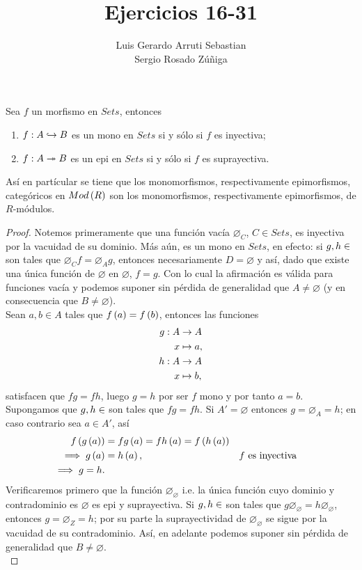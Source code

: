 \documentclass{article}
\title{Ejercicios 16-31}
\author{Luis Gerardo Arruti Sebastian\\ Sergio Rosado Zúñiga}
\date{}
\begin{document}
	\maketitle
	\begin{lem}
		Sea $f$ un morfismo en $Sets$, entonces
		\begin{enumerate}[label=$\alph*)$]
			\item $\catarrow{f}{A}{B}{m}$ es un mono en $Sets$ si y sólo si $f$ es inyectiva;
			\item $\catarrow{f}{A}{B}{e}$ es un epi en $Sets$ si y sólo si $f$ es suprayectiva.
		\end{enumerate}
		Así en partícular se tiene que los monomorfismos, respectivamente epimorfismos, categóricos en $Mod\left(R\right)$ son los monomorfismos, respectivamente epimorfismos, de $R$-módulos.
		\begin{proof}
			 Notemos primeramente que una función vacía $\varnothing_C$, $C\in Sets$, es inyectiva por la vacuidad de su dominio. Más aún, es un mono en $Sets$, en efecto: si $g,h\in\ringmod{Sets}{D}{\varnothing}$ son tales que $\varnothing_C f=\varnothing_A g$, entonces necesariamente $D=\varnothing$ y así, dado que existe una única función de $\varnothing$ en $\varnothing$, $f=g$. Con lo cual la afirmación es válida para funciones vacía y podemos suponer sin pérdida de generalidad que $A\neq\varnothing$ (y en consecuencia que $B\neq\varnothing$).\\
			 Sean $a,b\in A$ tales que $f\left(a\right)=f\left(b\right)$, entonces las funciones
			\begin{align*}
				g: A &\rightarrow A\\ x &\mapsto a,\\
				h: A &\rightarrow A\\ x &\mapsto b,
			\end{align*}
			satisfacen que $fg=fh$, luego $g=h$ por  ser $f$ mono y por tanto $a=b$.\\
			 Supongamos que  $g,h\in\ringmod{Sets}{A'}{A}$ son tales que $fg=fh$. Si $A'=\varnothing$ entonces $g=\varnothing_A=h$; en caso contrario sea $a\in A'$, así
			\begin{align*}
				f\left(g\left(a\right)\right)&=fg\left(a\right)=fh\left(a\right)=f\left(h\left(a\right)\right)\\
				\implies g\left(a\right)&=h\left(a\right), && f\text{ es inyectiva}\\
				\implies g=h.
			\end{align*}
			 Verificaremos primero que la función $\varnothing_\varnothing$ i.e. la única función cuyo dominio y contradominio es $\varnothing$ es epi y suprayectiva. Si  $g,h\in\ringmod{Sets}{\varnothing}{Z}$ son tales que $g\varnothing_\varnothing=h\varnothing_\varnothing$, entonces $g=\varnothing_Z=h$; por su parte la suprayectividad de $\varnothing_\varnothing$ se sigue por la vacuidad de su contradominio. Así, en adelante podemos suponer sin pérdida de generalidad que $B\neq\varnothing$.\\

\end{proof}
\end{lem}
\end{document}
